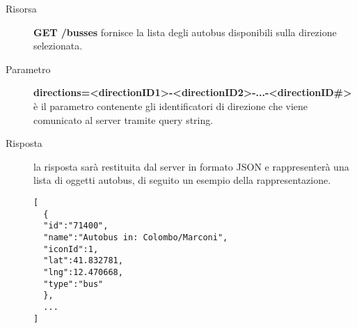 \newpage
\begin{description}

	\item[Risorsa] \textbf{GET /busses} fornisce la lista degli autobus disponibili sulla direzione selezionata.
  \item[Parametro] \textbf{directions=<directionID1>-<directionID2>-...-<directionID\#>} è il parametro contenente gli identificatori di direzione che viene comunicato al server tramite query string.
	\item[Risposta] la risposta sarà restituita dal server in formato JSON e rappresenterà una lista di oggetti autobus, di seguito un esempio della rappresentazione.

	\begin{verbatim}
[
  {
  "id":"71400",
  "name":"Autobus in: Colombo/Marconi",
  "iconId":1,
  "lat":41.832781,
  "lng":12.470668,
  "type":"bus"
  },
  ...
]
	\end{verbatim}
\end{description}
